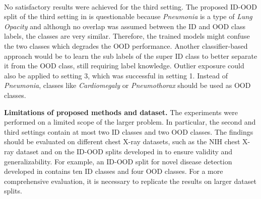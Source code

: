 \\
No satisfactory results were achieved for the third setting.
The proposed ID-OOD split of the third setting in \citep{Berger2021} is questionable because \textit{Pneumonia} is a type of \textit{Lung Opacity} \citep{Hansell2008} and although no overlap was assumed between the ID and OOD class labels, the classes are very similar. 
Therefore, the trained models might confuse the two classes which degrades the OOD performance. 
Another classifier-based approach would be to learn the sub labels of the super ID class to better separate it from the OOD class, still requiring label knowledge.
Outlier exposure could also be applied to setting 3, which was successful in setting 1.
Instead of \textit{Pneumonia}, classes like \textit{Cardiomegaly} or \textit{Pneumothorax} should be used as OOD classes.
\par
\textbf{Limitations of proposed methods and dataset.}
The experiments were performed on a limited scope of the larger problem.
In particular, the second and third settings contain at most two ID classes and two OOD classes.
The findings should be evaluated on different chest X-ray datasets, such as the NIH chest X-ray dataset \citep{Wang2017} and on the ID-OOD splits developed in \citep{Cao2020} to ensure validity and generalizability.
For example, an ID-OOD split for novel disease detection developed in \citep{Cao2020} contains ten ID classes and four OOD classes.
For a more comprehensive evaluation, it is necessary to replicate the results on larger dataset splits.

